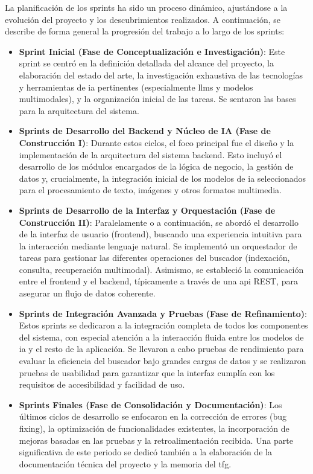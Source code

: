 La planificación de los sprints ha sido un proceso dinámico, ajustándose a la evolución del proyecto y los descubrimientos realizados. A continuación, se describe de forma general la progresión del trabajo a lo largo de los sprints:

\begin{itemize}
    \item \textbf{Sprint Inicial (Fase de Conceptualización e Investigación)}:
        Este sprint se centró en la definición detallada del alcance del proyecto, la elaboración del estado del arte, la investigación exhaustiva de las tecnologías y herramientas de \gls{ia} pertinentes (especialmente \glspl{llm} y modelos multimodales), y la organización inicial de las tareas. Se sentaron las bases para la arquitectura del sistema.

    \item \textbf{Sprints de Desarrollo del Backend y Núcleo de IA (Fase de Construcción I)}:
        Durante estos ciclos, el foco principal fue el diseño y la implementación de la arquitectura del sistema backend. Esto incluyó el desarrollo de los módulos encargados de la lógica de negocio, la gestión de datos y, crucialmente, la integración inicial de los modelos de \gls{ia} seleccionados para el procesamiento de texto, imágenes y otros formatos multimedia.

    \item \textbf{Sprints de Desarrollo de la Interfaz y Orquestación (Fase de Construcción II)}:
        Paralelamente o a continuación, se abordó el desarrollo de la interfaz de usuario (frontend), buscando una experiencia intuitiva para la interacción mediante lenguaje natural. Se implementó un orquestador de tareas para gestionar las diferentes operaciones del buscador (indexación, consulta, recuperación multimodal). Asimismo, se estableció la comunicación entre el frontend y el backend, típicamente a través de una \gls{api} REST, para asegurar un flujo de datos coherente.

    \item \textbf{Sprints de Integración Avanzada y Pruebas (Fase de Refinamiento)}:
        Estos sprints se dedicaron a la integración completa de todos los componentes del sistema, con especial atención a la interacción fluida entre los modelos de \gls{ia} y el resto de la aplicación. Se llevaron a cabo pruebas de rendimiento para evaluar la eficiencia del buscador bajo grandes cargas de datos y se realizaron pruebas de usabilidad para garantizar que la interfaz cumplía con los requisitos de accesibilidad y facilidad de uso.

    \item \textbf{Sprints Finales (Fase de Consolidación y Documentación)}:
        Los últimos ciclos de desarrollo se enfocaron en la corrección de errores (bug fixing), la optimización de funcionalidades existentes, la incorporación de mejoras basadas en las pruebas y la retroalimentación recibida. Una parte significativa de este periodo se dedicó también a la elaboración de la documentación técnica del proyecto y la memoria del \gls{tfg}.
\end{itemize}

